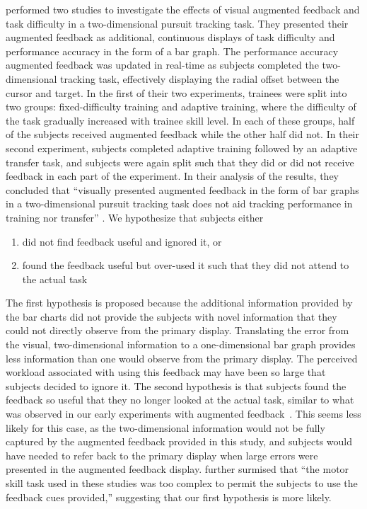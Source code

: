 \citeauthor{doi:10.1177/107118137802200127} performed two studies to investigate the effects of visual augmented feedback and task difficulty in a two-dimensional pursuit tracking task.
They presented their augmented feedback as additional, continuous displays of task difficulty and performance accuracy in the form of a bar graph.
The performance accuracy augmented feedback was updated in real-time as subjects completed the two-dimensional tracking task, effectively displaying the radial offset between the cursor and target.
In the first of their two experiments, trainees were split into two groups: fixed-difficulty training and adaptive training, where the difficulty of the task gradually increased with trainee skill level.
In each of these groups, half of the subjects received augmented feedback while the other half did not.
In their second experiment, subjects completed adaptive training followed by an adaptive transfer task, and subjects were again split such that they did or did not receive feedback in each part of the experiment.
In their analysis of the results, they concluded that ``visually presented augmented feedback in the form of bar graphs in a two-dimensional pursuit tracking task does not aid tracking performance in training nor transfer'' \citep{doi:10.1177/107118137802200127}.
We hypothesize that subjects either
\begin{enumerate}
    \item did not find feedback useful and ignored it, or
    \item found the feedback useful but over-used it such that they did not attend to the actual task
\end{enumerate}
The first hypothesis is proposed because the additional information provided by the bar charts did not provide the subjects with novel information that they could not directly observe from the primary display.
Translating the error from the visual, two-dimensional information to a one-dimensional bar graph provides less information than one would observe from the primary display.
The perceived workload associated with using this feedback may have been so large that subjects decided to ignore it.
The second hypothesis is that subjects found the feedback so useful that they no longer looked at the actual task, similar to what was observed in our early experiments with augmented feedback~\citep{karasinski_real-time_2016}.
This seems less likely for this case, as the two-dimensional information would not be fully captured by the augmented feedback provided in this study, and subjects would have needed to refer back to the primary display when large errors were presented in the augmented feedback display.
\citeauthor{doi:10.1177/107118137802200127} further surmised that ``the motor skill task used in these studies was too complex to permit the subjects to use the feedback cues provided,'' suggesting that our first hypothesis is more likely.

